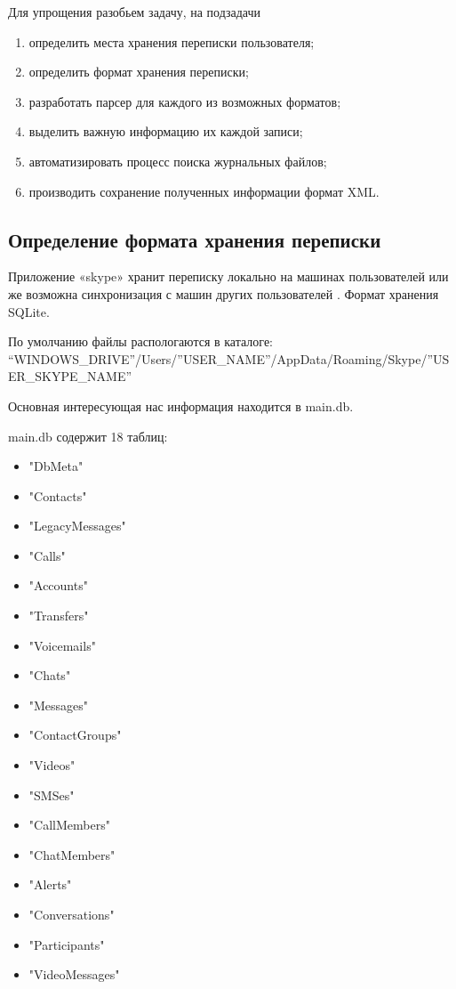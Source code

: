 Для упрощения разобьем задачу, на подзадачи

\begin{enumerate}
\item определить места хранения переписки пользователя;
\item определить формат хранения переписки;
\item разработать парсер для каждого из возможных форматов;
\item выделить важную информацию их каждой записи;
\item автоматизировать процесс поиска журнальных файлов;
\item производить сохранение полученных информации формат XML.
\end{enumerate}

\subsection{Определение формата хранения переписки}

Приложение «skype» хранит переписку локально на машинах пользователей или же возможна синхронизация с машин других пользователей \cite{skypechat}. Формат хранения SQLite. 

По умолчанию файлы распологаются в каталоге: \\“WINDOWS\_DRIVE”/Users/”USER\_NAME”/AppData/Roaming/Skype/”USER\_SKYPE\_NAME”

Основная интересующая нас информация находится в main.db.

main.db  содержит 18 таблиц:

\begin{itemize} 
\item"DbMeta"
\item"Contacts"
\item"LegacyMessages"
\item"Calls"
\item"Accounts"
\item"Transfers"
\item"Voicemails"
\item"Chats"
\item"Messages"   
\item"ContactGroups"
\item"Videos"
\item"SMSes"
\item"CallMembers"
\item"ChatMembers"
\item"Alerts"
\item"Conversations"
\item"Participants"
\item"VideoMessages"
\end{itemize}

